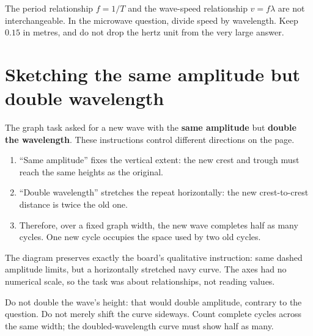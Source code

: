 \documentclass[11pt,a4paper]{article}
\newcommand{\trap}[1]{\begin{mistakebox}#1\end{mistakebox}}
\begin{document}
\trap{The period relationship $f=1/T$ and the wave-speed relationship $v=f\lambda$ are not interchangeable. In the microwave question, divide speed by wavelength. Keep $0.15$ in metres, and do not drop the hertz unit from the very large answer.}

\section{Sketching the same amplitude but double wavelength}
The graph task asked for a new wave with the \textbf{same amplitude} but \textbf{double the wavelength}. These instructions control different directions on the page.

\begin{enumerate}
\item ``Same amplitude'' fixes the vertical extent: the new crest and trough must reach the same heights as the original.
\item ``Double wavelength'' stretches the repeat horizontally: the new crest-to-crest distance is twice the old one.
\item Therefore, over a fixed graph width, the new wave completes half as many cycles. One new cycle occupies the space used by two old cycles.
\end{enumerate}

\begin{center}
\end{center}

The diagram preserves exactly the board's qualitative instruction: same dashed amplitude limits, but a horizontally stretched navy curve. The axes had no numerical scale, so the task was about relationships, not reading values.

\trap{Do not double the wave's height: that would double amplitude, contrary to the question. Do not merely shift the curve sideways. Count complete cycles across the same width; the doubled-wavelength curve must show half as many.}
\end{document}
